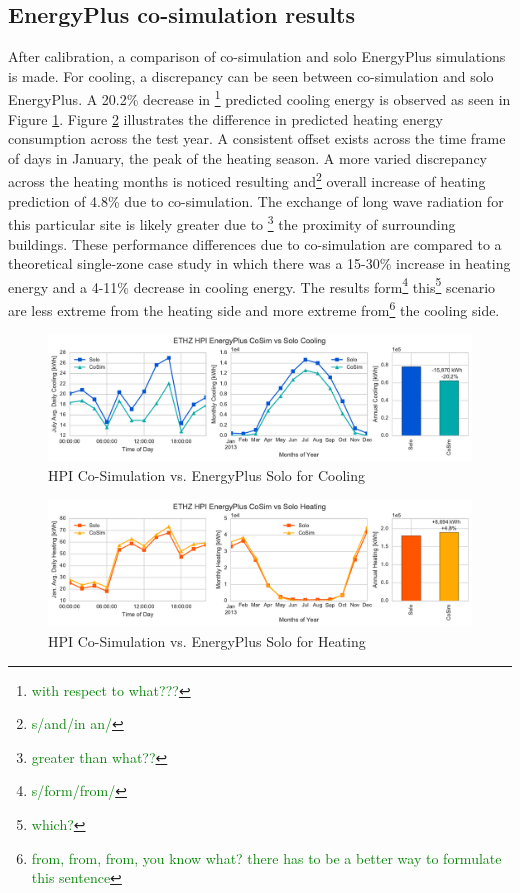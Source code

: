 \documentclass{tBPS2e}
\theoremstyle{plain}
\theoremstyle{definition}
\theoremstyle{remark}
\newcommand{\noteDT}[1]{\footnote{\textcolor{green}{#1}}}
\begin{document}
\subsection{EnergyPlus co-simulation results}

After calibration, a comparison of co-simulation and solo EnergyPlus simulations is made. For cooling, a discrepancy can be seen between co-simulation and solo EnergyPlus. A 20.2\% decrease in \noteDT{with respect to what???} predicted cooling energy is observed as seen in Figure \ref{fig:hpi_energypluscooling}. Figure \ref{fig:hpi_energyplusheating} illustrates the difference in predicted heating energy consumption across the test year. A consistent offset exists across the time frame of days in January, the peak of the heating season. A more varied discrepancy across the heating months is noticed resulting and\noteDT{s/and/in an/} overall increase of heating prediction of 4.8\% due to co-simulation. The exchange of long wave radiation for this particular site is likely greater due to \noteDT{greater than what??} the proximity of surrounding buildings. These performance differences due to co-simulation are compared to a theoretical single-zone case study in which there was a 15-30\% increase in heating energy and a 4-11\% decrease in cooling energy. The results form\noteDT{s/form/from/} this\noteDT{which?} scenario are less extreme from the heating side and more extreme from\noteDT{from, from, from, you know what? there has to be a better way to formulate this sentence} the cooling side.

\begin{figure}[H]
\centering
\includegraphics[scale=0.55]{figures/HPI_EnergyPlus_Cooling}
\caption{HPI Co-Simulation vs. EnergyPlus Solo for Cooling}
\label{fig:hpi_energypluscooling}
\end{figure}


\begin{figure}[H]
\centering
\includegraphics[scale=0.55]{figures/HPI_EnergyPlus_Heating}
\caption{HPI Co-Simulation vs. EnergyPlus Solo for Heating}
\label{fig:hpi_energyplusheating}
\end{figure}
\end{document}
